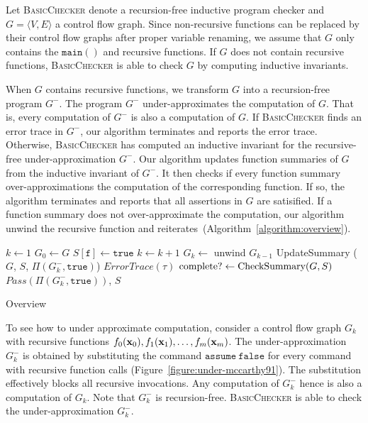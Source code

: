 
Let \textsc{BasicChecker} denote a recursion-free inductive program
checker and $G = \langle V, E \rangle$ a control flow graph. Since
non-recursive functions can be replaced by their control flow graphs
after proper variable renaming, we assume that $G$ only contains the
$\mathtt{main()}$ and recursive functions. If $G$ does not contain
recursive functions, \textsc{BasicChecker} is able to check $G$ by
computing inductive invariants.

When $G$ contains recursive functions, we transform $G$ into a
recursion-free program $G^-$. The program $G^-$
under-approximates the computation of $G$. That is, every computation
of $G^-$ is also a computation of $G$. If
\textsc{BasicChecker} finds an error trace in $G^-$, our
algorithm terminates and reports the error trace. Otherwise,
\textsc{BasicChecker} has computed an inductive invariant for the
recursive-free under-approximation $G^-$. Our algorithm
updates function summaries of $G$ from the inductive invariant of
$G^-$. It then checks if every function summary
over-approximations the computation of the corresponding function. If
so, the algorithm terminates and reports that all assertions in $G$
are satisified. If a function summary does not over-approximate the
computation, our algorithm unwind the recursive function and
reiterates~(Algorithm~\ref{algorithm:overview}).

\begin{algorithm}
  $k \leftarrow 1$\;
  $G_0 \leftarrow G$\;
  {
    $S[\mathtt{f}] \leftarrow \mathtt{true}$\;
  }
  {
    $k \leftarrow k + 1$\;
    $G_{k} \leftarrow $ unwind $G_{k-1}$\;
    {
      {    
        UpdateSummary ($G$, $S$, $\Pi (G^-_k, \mathtt{true})$)\;
      }
      {
        \Return $\mathit{ErrorTrace} (\tau)$\;
      }
    }
    $\textmd{complete?} \leftarrow \textmd{CheckSummary} (G, S)$\;
  }
  \Return $\mathit{Pass} (\Pi (G^-_k, \mathtt{true}))$, $S$\;
  \caption{Overview}
  \label{algorithm:overview}
\end{algorithm}

To see how to under approximate computation, consider a control flow
graph $G_k$ with recursive functions $f_0 (\textbf{x}_0), f_1 (\textbf{x}_1),
\ldots, f_m (\textbf{x}_m)$. The under-approximation $G^-_k$ is
obtained by substituting the command $\mathtt{assume\ false}$ for
every command with recursive function calls
(Figure~\ref{figure:under-mccarthy91}). The substitution
effectively blocks all recursive invocations. Any computation of
$G^-_k$ hence is also a computation of $G_k$. Note that
$G^-_k$ is recursion-free. \textsc{BasicChecker} is able to
check the under-approximation $G^-_k$.

